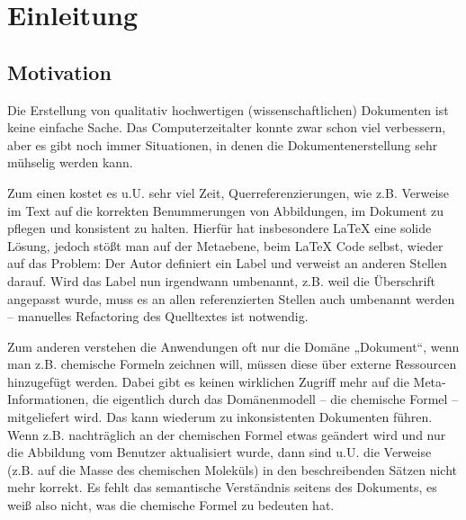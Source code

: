 \newcommand{\scaltex}{Scaltex's Latex Projection}
 
 
\chapter{Einleitung}\label{}
 
\section{Motivation}\label{}
 
Die Erstellung von qualitativ hochwertigen (wissenschaftlichen) Dokumenten ist keine einfache Sache. Das Computerzeitalter konnte zwar schon viel verbessern, aber es gibt noch immer Situationen, in denen die Dokumentenerstellung sehr mühselig werden kann.

 
Zum einen kostet es u.U. sehr viel Zeit, Querreferenzierungen, wie z.B. Verweise im Text auf die korrekten Benummerungen von Abbildungen, im Dokument zu pflegen und konsistent zu halten. Hierfür hat insbesondere LaTeX eine solide Lösung, jedoch stößt man auf der Metaebene, beim LaTeX Code selbst, wieder auf das Problem: Der Autor definiert ein Label und verweist an anderen Stellen darauf. Wird das Label nun irgendwann umbenannt, z.B. weil die Überschrift angepasst wurde, muss es an allen referenzierten Stellen auch umbenannt werden -- manuelles Refactoring des Quelltextes ist notwendig.

 
Zum anderen verstehen die Anwendungen oft nur die Domäne „Dokument“, wenn man z.B. chemische Formeln zeichnen will, müssen diese über externe Ressourcen hinzugefügt werden. Dabei gibt es keinen wirklichen Zugriff mehr auf die Meta-Informationen, die eigentlich durch das Domänenmodell -- die chemische Formel -- mitgeliefert wird. Das kann wiederum zu inkonsistenten Dokumenten führen. Wenn z.B. nachträglich an der chemischen Formel etwas geändert wird und nur die Abbildung vom Benutzer aktualisiert wurde, dann sind u.U. die Verweise (z.B. auf die Masse des chemischen Moleküls) in den beschreibenden Sätzen nicht mehr korrekt. Es fehlt das semantische Verständnis seitens des Dokuments, es weiß also nicht, was die chemische Formel zu bedeuten hat.

